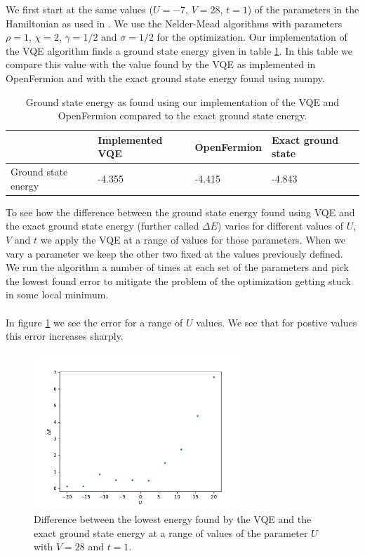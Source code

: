 \documentclass[10 pt, a4paper]{article}
\begin{document}
We first start at the same values ($U = -7$, $V = 28$, $t = 1$) of the parameters in the Hamiltonian as used in \cite{neutscat}. We use the Nelder-Mead algorithms with parameters $\rho = 1$, $\chi = 2$, $\gamma = 1/2$ and $\sigma = 1/2$ for the optimization. Our implementation of the VQE algorithm finds a ground state energy given in table \ref{tab:results}. In this table we compare this value with the value found by the VQE as implemented in OpenFermion and with the exact ground state energy found using numpy.

\begin{table}[H]
\centering
\caption{Ground state energy as found using our implementation of the VQE and OpenFermion compared to the exact ground state energy.}
\begin{tabular}{|l|lll|}
\hline
                    & Implemented VQE & OpenFermion & Exact ground state \\ \hline
Ground state energy & -4.355          & -4.415      & -4.843             \\ \hline
\end{tabular} \label{tab:results}
\end{table}



To see how the difference between the ground state energy found using VQE and the exact ground state energy (further called $\Delta E$) varies for different values of $U$, $V$ and $t$ we apply the VQE at a range of values for those parameters. When we vary a parameter we keep the other two fixed at the values previously defined. We run the algorithm a number of times at each set of the parameters and pick the lowest found error to mitigate the problem of the optimization getting stuck in some local minimum.
\\
\\
In figure \ref{fig:uerror} we see the error for a range of $U$ values. We see that for postive values this error increases sharply.

\begin{figure}[H]
\centering
	\includegraphics[width=0.7\textwidth]{uerror}
\caption{Difference between the lowest energy found by the VQE and the exact ground state energy at a range of values of the parameter $U$ with $V = 28$ and $t = 1$.} \label{fig:uerror}
\end{figure}
\end{document}
